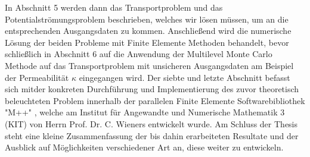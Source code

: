 In Abschnitt 5 werden dann das Transportproblem und das Potentialströmungsproblem beschrieben, welches wir lösen müssen, um an die entsprechenden Ausgangsdaten zu kommen. Anschließend wird die numerische Lösung der beiden Probleme mit Finite Elemente Methoden behandelt, bevor schließlich in Abschnitt 6 auf die Anwendung der Multilevel Monte Carlo Methode auf das Transportproblem mit unsicheren Ausgangsdaten am Beispiel der Permeabilität $\kappa$ eingegangen wird. \newline
Der siebte und letzte Abschnitt befasst sich mitder  konkreten Durchführung und Implementierung des zuvor theoretisch beleuchteten Problem innerhalb der parallelen Finite Elemente Softwarebibliothek "M++" \cite{siteM++},
welche am Institut für Angewandte und Numerische Mathematik 3 (KIT) von Herrn Prof. Dr. C. Wieners entwickelt wurde. \newline
Am Schluss der Thesis steht eine kleine Zusammenfassung der bis dahin erarbeiteten Resultate und der Ausblick auf Möglichkeiten verschiedener Art an, diese weiter zu entwickeln.